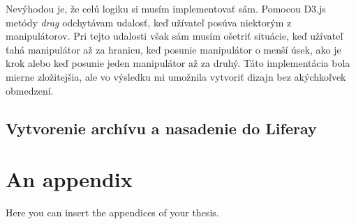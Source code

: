 \documentclass[
  digital, %
  twoside, %
  notable,   %
  nolof,   %
  nolot,   %
]{fithesis3}
\begin{document}
Nevýhodou je, že celú logiku si musím implementovať sám. Pomocou D3.js metódy \textit{drag} odchytávam udalosť, keď užívateľ posúva niektorým z manipulátorov. Pri tejto udalosti však sám musím ošetriť situácie, keď užívateľ ťahá manipulátor až za hranicu, keď posunie manipulátor o menší úsek, ako je krok alebo keď posunie jeden manipulátor až za druhý. Táto implementácia bola mierne zložitejšia, ale vo výsledku mi umožnila vytvoriť dizajn bez akýchkoľvek obmedzení.

\section{Vytvorenie archívu a nasadenie do Liferay}


\printbibliography[heading=bibintoc] %

  \makeatletter\thesis@blocks@clear\makeatother
  \printindex

\appendix %
\chapter{An appendix}
Here you can insert the appendices of your thesis.
\end{document}
